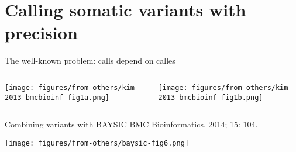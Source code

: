 \documentclass{beamer} %
\begin{document}



\section{Calling somatic variants with precision}

\begin{frame}{The well-known problem: calls depend on calles}
\begin{columns}[t]
\begin{column}{0.5\textwidth}

\texttt{[image: figures/from-others/kim-2013-bmcbioinf-fig1a.png]}
\end{column}
\begin{column}{0.5\textwidth}

\texttt{[image: figures/from-others/kim-2013-bmcbioinf-fig1b.png]}
\end{column}
\end{columns}
\end{frame}

\begin{frame}{Combining variants with BAYSIC}
{BMC Bioinformatics. 2014; 15: 104.}

\texttt{[image: figures/from-others/baysic-fig6.png]}
\end{frame}
\end{document}
